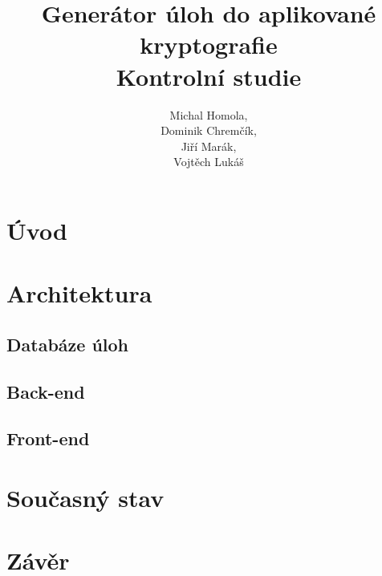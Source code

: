 \documentclass[titlepage]{article}
\title{Generátor úloh do aplikované kryptografie\\Kontrolní studie}
\author{Michal Homola,\\Dominik Chremčík,\\Jiří Marák,\\Vojtěch Lukáš}
\begin{document}
\maketitle

\tableofcontents

\section*{Úvod}

\section{Architektura}

\subsection{Databáze úloh}

\subsection{Back-end}

\subsection{Front-end}

\section{Současný stav}

\section*{Závěr}
\end{document}
